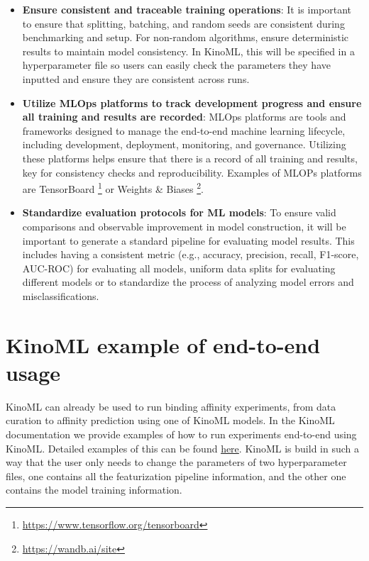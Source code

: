 \documentclass[9pt,lessons]{livecoms}
\begin{document}
\begin{itemize}
\item\textbf{Ensure consistent and traceable training operations}: It is important to ensure that splitting, batching, and random seeds are consistent during benchmarking and setup. For non-random algorithms, ensure deterministic results to maintain model consistency. In KinoML, this will be specified in a hyperparameter file so users can easily check the parameters they have inputted and ensure they are consistent across runs. 

\item\textbf{Utilize MLOps platforms to track development progress and ensure all training and results are recorded}: MLOps platforms are tools and frameworks designed to manage the end-to-end machine learning lifecycle, including development, deployment, monitoring, and governance. Utilizing these platforms helps ensure that there is a record of all training and results, key for consistency checks and reproducibility. Examples of MLOPs platforms are TensorBoard \footnote{\href{https://www.tensorflow.org/tensorboard}{https://www.tensorflow.org/tensorboard}} or Weights \& Biases \footnote{\href{https://wandb.ai/site}{https://wandb.ai/site}}.

\item\textbf{Standardize evaluation protocols for ML models}: To ensure valid comparisons and observable improvement in model construction, it will be important to generate a standard pipeline for evaluating model results. This includes having a consistent metric (e.g., accuracy, precision, recall, F1-score, AUC-ROC) for evaluating all models, uniform data splits for evaluating different models or to standardize the process of analyzing model errors and misclassifications.


\end{itemize}

\section{KinoML example of end-to-end usage}

KinoML can already be used to run binding affinity experiments, from data curation to affinity prediction using one of KinoML models. In the KinoML documentation we provide examples of how to run experiments end-to-end using KinoML. Detailed examples of this can be found \href{https://github.com/openkinome/kinoml/tree/master/tutorials/experiments}{here}. KinoML is build in such a way that the user only needs to change the parameters of two hyperparameter files, one contains all the featurization pipeline information, and the other one contains the model training information. 
\end{document}
